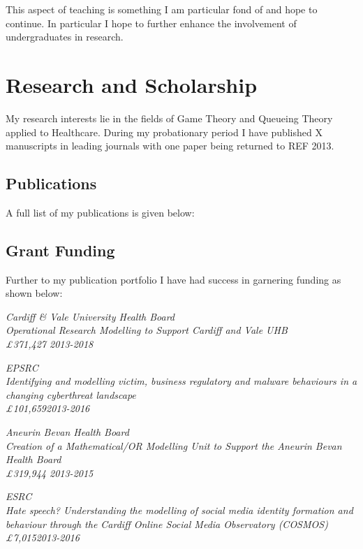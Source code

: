 \documentclass{article}
\begin{document}
This aspect of teaching is something I am particular fond of and hope to continue.
In particular I hope to further enhance the involvement of undergraduates in research.

\section{Research and Scholarship}\label{sec:research}

My research interests lie in the fields of Game Theory and Queueing Theory applied to Healthcare.
During my probationary period I have published X manuscripts in leading journals with one paper being returned to REF 2013.

\subsection{Publications}

A full list of my publications is given below:



\subsection{Grant Funding}

Further to my publication portfolio I have had success in garnering funding as shown below:

\sl{Cardiff \& Vale University Health Board}\\
Operational Research Modelling to Support Cardiff and Vale UHB\\
\pounds 371,427 \hfill{2013-2018}


\sl{EPSRC}\\
Identifying and modelling victim, business regulatory and malware behaviours in a changing cyberthreat landscape\\
\pounds101,659\hfill{2013-2016}


\sl{Aneurin Bevan Health Board}\\
Creation of a Mathematical/OR Modelling Unit to Support the Aneurin Bevan Health Board\\
\pounds319,944 \hfill{2013-2015}


\sl{ESRC}\\
Hate speech? Understanding the modelling of social media identity formation and behaviour through the Cardiff Online Social Media Observatory (COSMOS)\\
\pounds7,015\hfill{2013-2016}
\end{document}

